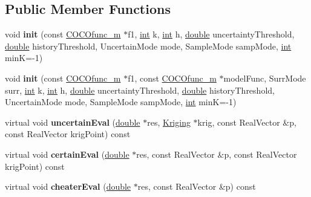 \subsection*{Public Member Functions}
\begin{DoxyCompactItemize}
\item 
void {\bfseries init} (const \hyperlink{classCOCOfunc__m}{C\+O\+C\+Ofunc\+\_\+m} $\ast$f1, \hyperlink{classint}{int} k, \hyperlink{classint}{int} h, \hyperlink{classdouble}{double} uncertainty\+Threshold, \hyperlink{classdouble}{double} history\+Threshold, Uncertain\+Mode mode, Sample\+Mode samp\+Mode, \hyperlink{classint}{int} minK=-\/1)\hypertarget{classUncertainFunc__m_a40304e81b478c513f9c3fdfb3d8318cc}{}\label{classUncertainFunc__m_a40304e81b478c513f9c3fdfb3d8318cc}

\item 
void {\bfseries init} (const \hyperlink{classCOCOfunc__m}{C\+O\+C\+Ofunc\+\_\+m} $\ast$f1, const \hyperlink{classCOCOfunc__m}{C\+O\+C\+Ofunc\+\_\+m} $\ast$model\+Func, Surr\+Mode surr, \hyperlink{classint}{int} k, \hyperlink{classint}{int} h, \hyperlink{classdouble}{double} uncertainty\+Threshold, \hyperlink{classdouble}{double} history\+Threshold, Uncertain\+Mode mode, Sample\+Mode samp\+Mode, \hyperlink{classint}{int} minK=-\/1)\hypertarget{classUncertainFunc__m_a4613baa39433ebc0bb604b9febfc7bf6}{}\label{classUncertainFunc__m_a4613baa39433ebc0bb604b9febfc7bf6}

\item 
virtual void {\bfseries uncertain\+Eval} (\hyperlink{classdouble}{double} $\ast$res, \hyperlink{classKriging}{Kriging} $\ast$krig, const Real\+Vector \&p, const Real\+Vector krig\+Point) const \hypertarget{classUncertainFunc__m_a29cda88de0d93a9e250c8380f22b099a}{}\label{classUncertainFunc__m_a29cda88de0d93a9e250c8380f22b099a}

\item 
virtual void {\bfseries certain\+Eval} (\hyperlink{classdouble}{double} $\ast$res, const Real\+Vector \&p, const Real\+Vector krig\+Point) const \hypertarget{classUncertainFunc__m_a1571f80d7525a4c937b2f2844bc7960b}{}\label{classUncertainFunc__m_a1571f80d7525a4c937b2f2844bc7960b}

\item 
virtual void {\bfseries cheater\+Eval} (\hyperlink{classdouble}{double} $\ast$res, const Real\+Vector \&p) const \hypertarget{classUncertainFunc__m_aadcbc6f86fd49e6796e80e89a06810f5}{}\label{classUncertainFunc__m_aadcbc6f86fd49e6796e80e89a06810f5}


\end{DoxyCompactItemize}
